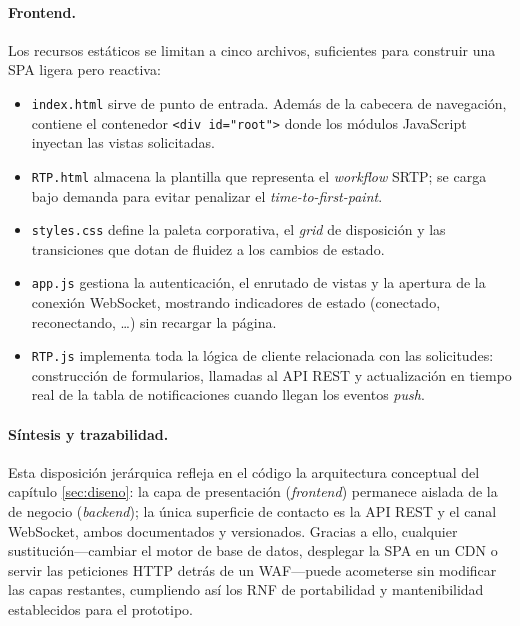 \paragraph*{Frontend.}
Los recursos estáticos se limitan a cinco archivos, suficientes para
construir una SPA ligera pero reactiva:

\begin{itemize}
  \item \texttt{index.html} sirve de punto de entrada.
        Además de la cabecera de navegación, contiene el
        contenedor \texttt{\textless{}div id="root"\textgreater{}} donde los
        módulos JavaScript inyectan las vistas solicitadas.
  \item \texttt{RTP.html} almacena la plantilla que representa el
        \emph{workflow} SRTP; se carga bajo demanda para evitar penalizar
        el \emph{time-to-first-paint}.
  \item \texttt{styles.css} define la paleta corporativa, el
        \emph{grid} de disposición y las transiciones que dotan de
        fluidez a los cambios de estado.
  \item \texttt{app.js} gestiona la autenticación,
        el enrutado de vistas
        y la apertura de la conexión WebSocket, mostrando indicadores de
        estado (conectado, reconectando, \dots) sin recargar la página.
  \item \texttt{RTP.js} implementa toda la lógica de cliente
        relacionada con las solicitudes: construcción de formularios,
        llamadas al API REST y actualización en tiempo real de la tabla
        de notificaciones cuando llegan los eventos \emph{push}.
\end{itemize}

\vspace{.2em}
\paragraph*{Síntesis y trazabilidad.}
Esta disposición jerárquica refleja en el código la arquitectura
conceptual del capítulo \ref{sec:diseno}: la capa de presentación
(\emph{frontend}) permanece aislada de la de negocio
(\emph{backend}); la única superficie de contacto es la API REST
y el canal WebSocket, ambos documentados y versionados.
Gracias a ello, cualquier sustitución—cambiar el
motor de base de datos, desplegar la SPA en un CDN o
servir las peticiones HTTP detrás de un WAF—puede acometerse
sin modificar las capas restantes, cumpliendo así los
RNF de portabilidad y mantenibilidad establecidos
para el prototipo.

